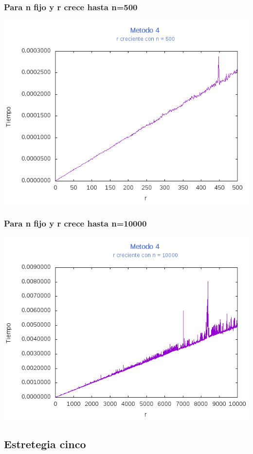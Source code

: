 \documentclass[12pt,letterpaper]{scrartcl}
\begin{document}
\subsubsection{Para n fijo y r crece hasta n=500}
\includegraphics[scale=1]{Metodo4/plot500m4}

\subsubsection{Para n fijo y r crece hasta n=10000}
\includegraphics[scale=1]{Metodo4/plot10000m4}
\newpage
\subsection{Estretegia cinco}
\end{document}
